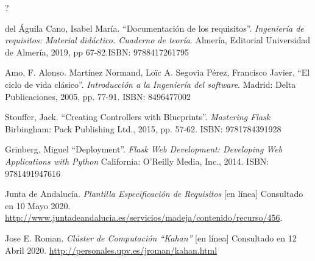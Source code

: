 \documentclass[11pt,spanish,listoffigures,listoftables]{tfgetsinf}
\begin{document}
?

\begin{thebibliography}{10}



	del Águila Cano, Isabel María.
	\newblock ``Documentación de los requisitos''. \textit{Ingeniería de requisitos: Material didáctico. Cuaderno de teoría}.
	\newblock Almería, Editorial Universidad de Almería, 2019, pp 67-82.ISBN: 9788417261795

	Amo, F. Alonso. Martínez Normand, Loïc A. Segovia Pérez, Francisco Javier.
	\newblock ``El ciclo de vida clásico''. \textit{Introducción a la Ingeniería del software}.
	\newblock Madrid: Delta Publicaciones, 2005, pp. 77-91. ISBN: 8496477002
	
	Stouffer, Jack.
	\newblock ``Creating Controllers with Blueprints''. \textit{Mastering Flask}
	\newblock Birbingham: Pack Publishing Ltd., 2015, pp. 57-62. ISBN: 9781784391928
	
	
	Grinberg, Miguel
	\newblock ``Deployment''. \textit{Flask Web Development: Developing Web Applications with Python}
	\newblock California: O'Reilly Media, Inc., 2014. ISBN: 9781491947616
	


   Junta de Andalucía. \textit{Plantilla Especificación de Requisitos} [en línea]
   \newblock Consultado en 10 Mayo 2020.
   \url{http://www.juntadeandalucia.es/servicios/madeja/contenido/recurso/456}.

	Jose E. Roman. \textit{Clúster de Computación ``Kahan''} [en línea]
	\newblock Consultado en 12 Abril 2020.
	\url{http://personales.upv.es/jroman/kahan.html}
	

\end{thebibliography}
\end{document}
